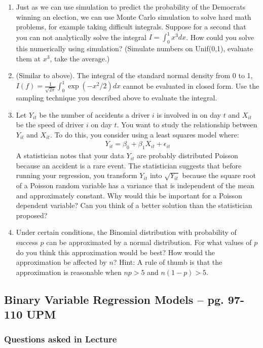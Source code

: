 \documentclass[11pt]{article}
\begin{document}
\begin{enumerate}
\item Just as we can use simulation to predict the probability of the Democrats winning an election, we can use Monte Carlo simulation to solve hard math problems, for example taking difficult integrals.  Suppose for a second that you can not analytically solve the integral $I = \int_{0}^{1}x^3dx$.  How could you solve this numerically using simulation? (Simulate numbers on Unif(0,1), evaluate them at $x^3$, take the average.) 
\item (Similar to above).  The integral of the standard normal density from 0 to 1, $I(f) = \frac{1}{\sqrt{2\pi}} \int_{0}^{1} \exp{(-x^2/2)}dx$ cannot be evaluated in closed form.  Use the sampling technique you described above to evaluate the integral. 
\item Let $Y_{it}$ be the number of accidents a driver $i$ is involved in on day $t$ and $X_{it}$ be the speed of driver $i$ on day $t$.  You want to study the relationship between $Y_{it}$ and $X_{it}$.  To do this, you consider using a least squares model where:
\begin{eqnarray*}
Y_{it} = \beta_0 + \beta_1X_{it} + \epsilon_{it}
\end{eqnarray*}
A statistician notes that your data $Y_{it}$ are probably distributed Poisson because an accident is a rare event.  The statistician suggests that before running your regression, you transform $Y_{it}$ into $\sqrt{Y_{it}}$ because the square root of a Poisson random variable has a variance that is independent of the mean and approximately constant.  Why would this be important for a Poisson dependent variable?  Can you think of a better solution than the statistician proposed? 
\item Under certain conditions, the Binomial distribution with probability of success $p$ can be approximated by a normal distribution.  For what values of $p$ do you think this approximation would be best? How would the approximation be affected by $n$?  Hint: A rule of thumb is that the approximation is reasonable when $np > 5$ and $n(1-p)>5$.  
\end{enumerate}

\subsection{Binary Variable Regression Models -- pg. 97-110 UPM} 
\subsubsection{Questions asked in Lecture}
\end{document}
